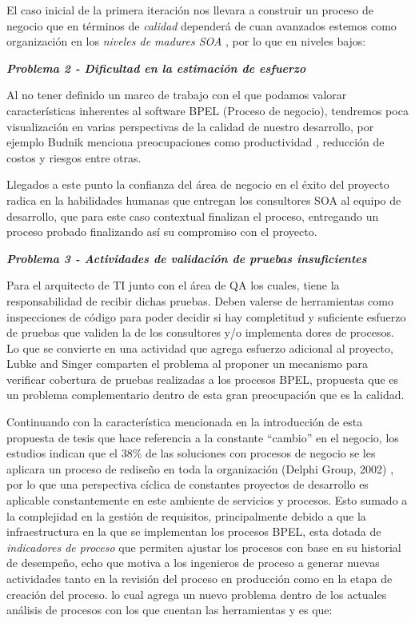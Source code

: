 \documentclass[spanish]{article}
\begin{document}
El caso inicial de la primera iteración nos llevara a construir un
proceso de negocio que en términos de \emph{calidad} dependerá de
cuan avanzados estemos como organización en los \emph{niveles de madures
SOA\cite{IBMSOAG2006}} , por lo que en niveles bajos:

\textbf{\emph{Problema 2 - Dificultad en la estimación de esfuerzo}}

Al no tener definido un marco de trabajo con el que podamos valorar
características inherentes al software BPEL (Proceso de negocio),
tendremos poca visualización en varias perspectivas de la calidad
de nuestro desarrollo, por ejemplo Budnik \cite{Budnik2011} menciona
preocupaciones como productividad , reducción de costos y riesgos
entre otras.

Llegados a este punto la confianza del área de negocio en el éxito
del proyecto radica en la habilidades humanas que entregan los consultores
SOA al equipo de desarrollo, que para este caso contextual finalizan
el proceso, entregando un proceso probado finalizando así su compromiso
con el proyecto.

\textbf{\emph{Problema 3 - Actividades de validación de pruebas insuficientes}}

Para el arquitecto de TI junto con el área de QA los cuales, tiene
la responsabilidad de recibir dichas pruebas. Deben valerse de herramientas
como inspecciones de código para poder decidir si hay completitud
y suficiente esfuerzo de pruebas que validen la de los consultores
y/o implementa dores de procesos. Lo que se convierte en una actividad
que agrega esfuerzo adicional al proyecto, Lubke and Singer \cite{DanielLubke2009}
comparten el problema al proponer un mecanismo para verificar cobertura
de pruebas realizadas a los procesos BPEL, propuesta que es un problema
complementario dentro de esta gran preocupación que es la calidad.

Continuando con la característica mencionada en la introducción de
esta propuesta de tesis que hace referencia a la constante ``cambio”
en el negocio, los estudios indican que el 38\% de las soluciones
con procesos de negocio se les aplicara un proceso de rediseño en
toda la organización (Delphi Group, 2002) \cite{Cardoso2008}, por
lo que una perspectiva cíclica de constantes proyectos de desarrollo
es aplicable constantemente en este ambiente de servicios y procesos.
Esto sumado a la complejidad en la gestión de requisitos, principalmente
debido a que la infraestructura en la que se implementan los procesos
BPEL, esta dotada de \emph{indicadores de proceso} que permiten ajustar
los procesos con base en su historial de desempeño, echo que motiva
a los ingenieros de proceso a generar nuevas actividades tanto en
la revisión del proceso en producción como en la etapa de creación
del proceso. lo cual agrega un nuevo problema dentro de los actuales
análisis de procesos con los que cuentan las herramientas y es que:
\end{document}

